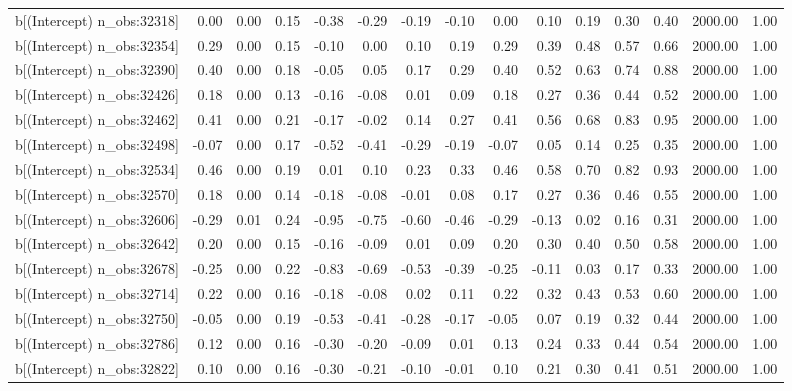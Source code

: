 \begin{table}[ht]
\begin{tabular}{rrrrrrrrrrrrrrr}
  b[(Intercept) n\_obs:32318] & 0.00 & 0.00 & 0.15 & -0.38 & -0.29 & -0.19 & -0.10 & 0.00 & 0.10 & 0.19 & 0.30 & 0.40 & 2000.00 & 1.00 \\ 
  b[(Intercept) n\_obs:32354] & 0.29 & 0.00 & 0.15 & -0.10 & 0.00 & 0.10 & 0.19 & 0.29 & 0.39 & 0.48 & 0.57 & 0.66 & 2000.00 & 1.00 \\ 
  b[(Intercept) n\_obs:32390] & 0.40 & 0.00 & 0.18 & -0.05 & 0.05 & 0.17 & 0.29 & 0.40 & 0.52 & 0.63 & 0.74 & 0.88 & 2000.00 & 1.00 \\ 
  b[(Intercept) n\_obs:32426] & 0.18 & 0.00 & 0.13 & -0.16 & -0.08 & 0.01 & 0.09 & 0.18 & 0.27 & 0.36 & 0.44 & 0.52 & 2000.00 & 1.00 \\ 
  b[(Intercept) n\_obs:32462] & 0.41 & 0.00 & 0.21 & -0.17 & -0.02 & 0.14 & 0.27 & 0.41 & 0.56 & 0.68 & 0.83 & 0.95 & 2000.00 & 1.00 \\ 
  b[(Intercept) n\_obs:32498] & -0.07 & 0.00 & 0.17 & -0.52 & -0.41 & -0.29 & -0.19 & -0.07 & 0.05 & 0.14 & 0.25 & 0.35 & 2000.00 & 1.00 \\ 
  b[(Intercept) n\_obs:32534] & 0.46 & 0.00 & 0.19 & 0.01 & 0.10 & 0.23 & 0.33 & 0.46 & 0.58 & 0.70 & 0.82 & 0.93 & 2000.00 & 1.00 \\ 
  b[(Intercept) n\_obs:32570] & 0.18 & 0.00 & 0.14 & -0.18 & -0.08 & -0.01 & 0.08 & 0.17 & 0.27 & 0.36 & 0.46 & 0.55 & 2000.00 & 1.00 \\ 
  b[(Intercept) n\_obs:32606] & -0.29 & 0.01 & 0.24 & -0.95 & -0.75 & -0.60 & -0.46 & -0.29 & -0.13 & 0.02 & 0.16 & 0.31 & 2000.00 & 1.00 \\ 
  b[(Intercept) n\_obs:32642] & 0.20 & 0.00 & 0.15 & -0.16 & -0.09 & 0.01 & 0.09 & 0.20 & 0.30 & 0.40 & 0.50 & 0.58 & 2000.00 & 1.00 \\ 
  b[(Intercept) n\_obs:32678] & -0.25 & 0.00 & 0.22 & -0.83 & -0.69 & -0.53 & -0.39 & -0.25 & -0.11 & 0.03 & 0.17 & 0.33 & 2000.00 & 1.00 \\ 
  b[(Intercept) n\_obs:32714] & 0.22 & 0.00 & 0.16 & -0.18 & -0.08 & 0.02 & 0.11 & 0.22 & 0.32 & 0.43 & 0.53 & 0.60 & 2000.00 & 1.00 \\ 
  b[(Intercept) n\_obs:32750] & -0.05 & 0.00 & 0.19 & -0.53 & -0.41 & -0.28 & -0.17 & -0.05 & 0.07 & 0.19 & 0.32 & 0.44 & 2000.00 & 1.00 \\ 
  b[(Intercept) n\_obs:32786] & 0.12 & 0.00 & 0.16 & -0.30 & -0.20 & -0.09 & 0.01 & 0.13 & 0.24 & 0.33 & 0.44 & 0.54 & 2000.00 & 1.00 \\ 
  b[(Intercept) n\_obs:32822] & 0.10 & 0.00 & 0.16 & -0.30 & -0.21 & -0.10 & -0.01 & 0.10 & 0.21 & 0.30 & 0.41 & 0.51 & 2000.00 & 1.00 \\ 

\end{tabular}
\end{table}
